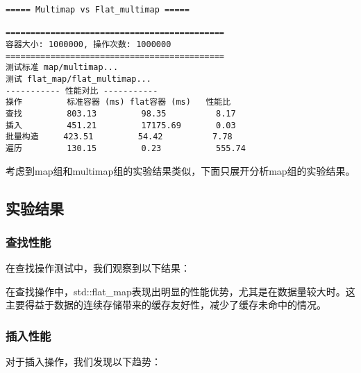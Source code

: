 \documentclass[a4paper, 12pt]{article}
\begin{document}
\begin{lstlisting}[style=cpp]
===== Multimap vs Flat_multimap =====

============================================
容器大小: 1000000, 操作次数: 1000000
============================================
测试标准 map/multimap...
测试 flat_map/flat_multimap...
----------- 性能对比 -----------
操作         标准容器 (ms) flat容器 (ms)   性能比
查找         803.13         98.35          8.17
插入         451.21         17175.69       0.03
批量构造     423.51         54.42          7.78
遍历         130.15         0.23           555.74
\end{lstlisting}

考虑到map组和multimap组的实验结果类似，下面只展开分析map组的实验结果。

\subsection{实验结果}

\subsubsection{查找性能}

在查找操作测试中，我们观察到以下结果：

\begin{center}\vspace{-20pt}
\end{center}

在查找操作中，std::flat\_map表现出明显的性能优势，尤其是在数据量较大时。这主要得益于数据的连续存储带来的缓存友好性，减少了缓存未命中的情况。

\subsubsection{插入性能}

对于插入操作，我们发现以下趋势：
\end{document}
